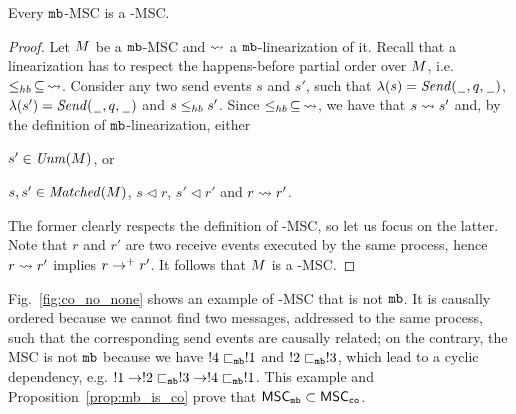 \begin{proposition} \label{prop:mb_is_co}
	Every $\mathtt{mb}$-MSC is a \co-MSC.
\end{proposition}
\begin{proof}
Let $M$ be a $\mathtt{mb}$-MSC and $\rightsquigarrow$ a $\mathtt{mb}$-linearization of it. Recall that a linearization has to respect the happens-before partial order over $M$, i.e. $\leq_{hb}\,\subseteq\, \rightsquigarrow$. Consider any two send events $s$ and $s'$, such that $\lambda(s)={\mathit{Send}(\hspace{0.1em}\underline{\hspace{0.5em}}\hspace{0.1em},q,\hspace{0.1em}\underline{\hspace{0.5em}}\hspace{0.1em})}$, $\lambda(s')={\mathit{Send}(\hspace{0.1em}\underline{\hspace{0.5em}}\hspace{0.1em},q,\hspace{0.1em}\underline{\hspace{0.5em}}\hspace{0.1em})}$ and $s \leq_{hb} s'$. Since $\leq_{hb}\,\subseteq\, \rightsquigarrow$, we have that $s \rightsquigarrow s'$ and, by the definition of $\mathtt{mb}$-linearization, either
\begin{enumerate*}[label={(\roman*)}]
	\item $s' \in \mathit{Unm}(M)$, or 
	\item $s,s' \in \mathit{Matched}(M)$, $s \lhd r$, $s' \lhd r'$ and $r \rightsquigarrow r'$. 
\end{enumerate*}
The former clearly respects the definition of \co-MSC, so let us focus on the latter. Note that $r$ and $r'$ are two receive events executed by the same process, hence $r \rightsquigarrow r'$ implies $r \to^+ r'$. It follows that $M$ is a \co-MSC.
\end{proof}

Fig.~\ref{fig:co_no_none} shows an example of \co-MSC that is not $\mathtt{mb}$. It is causally ordered because we cannot  find two messages, addressed to the same process, such that the corresponding send events are causally related; on the contrary, the MSC is not $\mathtt{mb}$ because we have $!4 \sqsubset_{\mathtt{mb}} !1$ and $!2 \sqsubset_{\mathtt{mb}} !3$, which lead to a cyclic dependency, e.g. $!1 \to !2 \sqsubset_{\mathtt{mb}} !3 \to !4 \sqsubset_{\mathtt{mb}} !1$. This example and Proposition~\ref{prop:mb_is_co} prove that $\mathsf{MSC}_{\mathtt{mb}} \subset \mathsf{MSC}_{\mathtt{co}}$.

